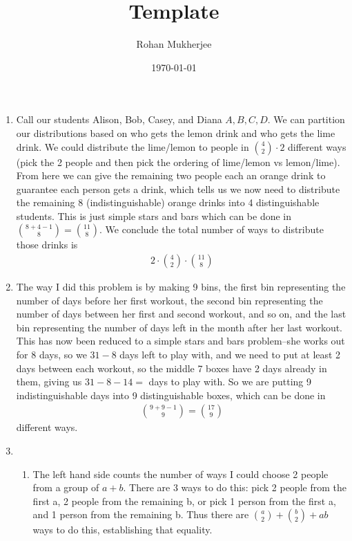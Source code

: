 \documentclass[12pt]{article}
\title{Template}
\date{\today}
\author{Rohan Mukherjee}
\theoremstyle{definitionstyle}
\begin{document}
	\maketitle
	\begin{enumerate}[leftmargin=\labelsep]
		\item Call our students Alison, Bob, Casey, and Diana $A, B, C, D$. We can partition our distributions based on who gets the lemon drink and who gets the lime drink. We could distribute the lime/lemon to people in ${4 \choose 2} \cdot 2$ different ways (pick the 2 people and then pick the ordering of lime/lemon vs lemon/lime). From here we can give the remaining two people each an orange drink to guarantee each person gets a drink, which tells us we now need to distribute the remaining 8 (indistinguishable) orange drinks into 4 distinguishable students. This is just simple stars and bars which can be done in ${8 + 4- 1 \choose 8} = {11 \choose 8}$. We conclude the total number of ways to distribute those drinks is 
		\begin{align*}
			\boxed{2 \cdot {4 \choose 2} \cdot {11 \choose 8}}
		\end{align*}
	
		\newpage
		\item The way I did this problem is by making 9 bins, the first bin representing the number of days before her first workout, the second bin representing the number of days between her first and second workout, and so on, and the last bin representing the number of days left in the month after her last workout. This has now been reduced to a simple stars and bars problem--she works out for 8 days, so we $31-8$ days left to play with, and we need to put at least 2 days between each workout, so the middle 7 boxes have 2 days already in them, giving us $31-8-14 = $ days to play with. So we are putting 9 indistinguishable days into 9 distinguishable boxes, which can be done in 
		\begin{align*}
			\boxed{{9+9-1 \choose 9} = {17 \choose 9}}
		\end{align*}
		different ways.
		
		\newpage
		\item \begin{enumerate}
			\item The left hand side counts the number of ways I could choose 2 people from a group of $a+b$. There are 3 ways to do this: pick 2 people from the first a, 2 people from the remaining b, or pick 1 person from the first a, and 1 person from the remaining b. Thus there are ${a \choose 2} + {b \choose 2} + ab$ ways to do this, establishing that equality.
			

\end{enumerate}
\end{enumerate}
\end{document}
